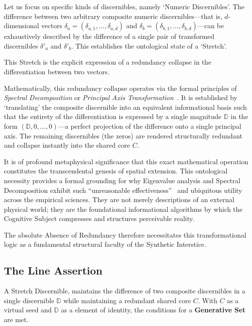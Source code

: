 Let us focus on specific kinds of discernibles, namely `Numeric Discernibles'.
The difference between two arbitrary composite numeric discernibles---that is,
$d$-dimensional vectors $\delta_a=(\delta_{a,1}, \dots, \delta_{a,d})$ and
$\delta_b=(\delta_{b,1}, \dots, \delta_{b,d})$---can be exhaustively described
by the difference of a single pair of transformed discernibles $\delta'_a$ and
$\delta'_b$. This establishes the ontological state of a `Stretch'. 

This Stretch is the explicit expression of a redundancy collapse in the
differentiation between two vectors. 

Mathematically, this redundancy collapse operates via the formal principles of
\textit{Spectral Decomposition} or \textit{Principal Axis
Transformation}~\cite{Euler}. It is established by `translating' the composite
discernible into an equivalent informational basis such that the entirety of
the differentiation is expressed by a single magnitude $\mathbb{D}$ in the form
$(\mathbb{D}, 0, \dots, 0)$---a perfect projection of the difference onto a
single principal axis. The remaining discernibles (the zeros) are rendered
structurally redundant and collapse instantly into the shared core
$C$.

It is of profound metaphysical significance that this exact
mathematical operation constitutes the transcendental genesis of spatial
extension. This ontological necessity provides a formal grounding for why
Eigenvalue analysis and Spectral Decomposition exhibit such ``unreasonable
effectiveness''~\cite{Wigner1960} and ubiquitous utility across the empirical
sciences. They are not merely descriptions of an external physical world; they
are the foundational informational algorithms by which the Cognitive Subject
compresses and structures perceivable reality.

The absolute Absence of Redundancy therefore necessitates this transformational
logic as a fundamental structural faculty of the Synthetic Interstice.

\subsection{The Line Assertion}

A Stretch Discernible, maintains the difference of two composite discernibles
in a single discernible $\mathbb{D}$ while maintaining a redundant shared core $C$.
With $C$ as a virtual seed and $\mathbb{D}$ as a element of identity, the conditions
for a \textbf{Generative Set} are met. 

